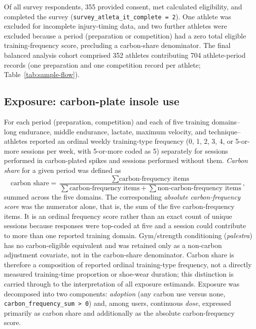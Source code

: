 Of all survey respondents, 355 provided consent, met calculated eligibility, and completed the survey (\texttt{survey\_atleta\_it\_complete = 2}). One athlete was excluded for incomplete injury-timing data, and two further athletes were excluded because a period (preparation or competition) had a zero total eligible training-frequency score, precluding a carbon-share denominator. The final balanced analysis cohort comprised 352 athletes contributing 704 athlete-period records (one preparation and one competition record per athlete; Table~\ref{tab:sample-flow}).

\subsection{Exposure: carbon-plate insole use}
\label{sec:exposure}
For each period (preparation, competition) and each of five training domains--long endurance, middle endurance, lactate, maximum velocity, and technique--athletes reported an ordinal weekly training-type frequency (0, 1, 2, 3, 4, or 5-or-more sessions per week, with 5-or-more coded as 5) separately for sessions performed in carbon-plated spikes and sessions performed without them. \emph{Carbon share} for a given period was defined as
\[
\text{carbon share} = \frac{\sum \text{carbon-frequency items}}{\sum \text{carbon-frequency items} + \sum \text{non-carbon-frequency items}},
\]
summed across the five domains. The corresponding \emph{absolute carbon-frequency score} was the numerator alone, that is, the sum of the five carbon-frequency items. It is an ordinal frequency score rather than an exact count of unique sessions because responses were top-coded at five and a session could contribute to more than one reported training domain. Gym/strength conditioning (\emph{palestra}) has no carbon-eligible equivalent and was retained only as a non-carbon adjustment covariate, not in the carbon-share denominator. Carbon share is therefore a composition of reported ordinal training-type frequency, not a directly measured training-time proportion or shoe-wear duration; this distinction is carried through to the interpretation of all exposure estimands. Exposure was decomposed into two components: \emph{adoption} (any carbon use versus none, \texttt{carbon\_frequency\_sum > 0}) and, among users, continuous \emph{dose}, expressed primarily as carbon share and additionally as the absolute carbon-frequency score.

